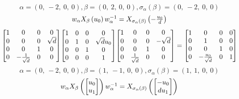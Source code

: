 \documentclass[11pt]{article}
\theoremstyle{definition}
\begin{document}
\[
\alpha = \left( 0, \  -2, \  0, \  0\right), \beta = \left( 0, \  2, \  0, \  0\right), \sigma_{\alpha}(\beta) = \left( 0, \  -2, \  0, \  0\right)
\]
\[
\scaletoalign{\textwidth}{w_{\alpha} X_{\beta}\left(u_{0}\right) w_{\alpha}^{-1} = X_{\sigma_{\alpha}\left(\beta\right)}\left(- \frac{u_{0}}{d}\right)}
\]
\[
\scaletoalign{\textwidth}{{\left[\begin{matrix}1 & 0 & 0 & 0\\0 & 0 & 0 & \sqrt{d}\\0 & 0 & 1 & 0\\0 & - \frac{1}{\sqrt{d}} & 0 & 0\end{matrix}\right]} {\left[\begin{matrix}1 & 0 & 0 & 0\\0 & 1 & 0 & \sqrt{d} u_{0}\\0 & 0 & 1 & 0\\0 & 0 & 0 & 1\end{matrix}\right]} {\left[\begin{matrix}1 & 0 & 0 & 0\\0 & 0 & 0 & - \sqrt{d}\\0 & 0 & 1 & 0\\0 & \frac{1}{\sqrt{d}} & 0 & 0\end{matrix}\right]} = {\left[\begin{matrix}1 & 0 & 0 & 0\\0 & 1 & 0 & 0\\0 & 0 & 1 & 0\\0 & - \frac{u_{0}}{\sqrt{d}} & 0 & 1\end{matrix}\right]}}
\]
\[
\alpha = \left( 0, \  -2, \  0, \  0\right), \beta = \left( 1, \  -1, \  0, \  0\right), \sigma_{\alpha}(\beta) = \left( 1, \  1, \  0, \  0\right)
\]
\[
\scaletoalign{\textwidth}{w_{\alpha} X_{\beta}\left(\left[\begin{matrix}u_{0}\\u_{1}\end{matrix}\right]\right) w_{\alpha}^{-1} = X_{\sigma_{\alpha}\left(\beta\right)}\left(\left[\begin{matrix}- u_{0}\\d u_{1}\end{matrix}\right]\right)}
\]
\end{document}
